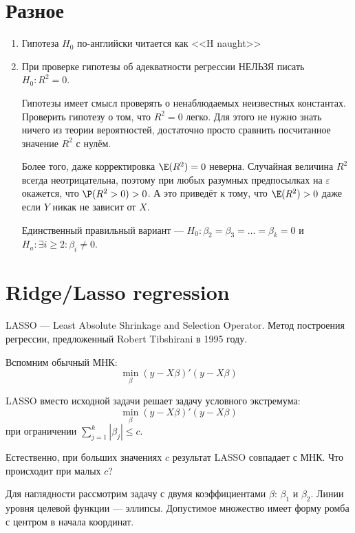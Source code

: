 \documentclass[pdftex,12pt,a4paper]{article}
\begin{document}
\section{Разное}
\begin{enumerate}

\item Гипотеза $H_0$ по-английски читается как <<H naught>>
\item При проверке гипотезы об адекватности регрессии НЕЛЬЗЯ писать $H_0: R^2=0$. 


Гипотезы имеет смысл проверять о ненаблюдаемых неизвестных константах. 
Проверить гипотезу о том, что $R^2=0$ легко. 
Для этого не нужно знать ничего из теории вероятностей, достаточно просто сравнить посчитанное значение $R^2$ с нулём. 

Более того, даже корректировка $\E(R^2)=0$ неверна. 
Случайная величина $R^2$ всегда неотрицательна, поэтому при любых разумных предпосылках на $\varepsilon$ окажется, что $\P(R^2>0)>0$. 
А это приведёт к тому, что $\E(R^2)>0$ даже если $Y$ никак не зависит от $X$.


Единственный правильный вариант --- $H_0: \beta_2=\beta_3=\ldots=\beta_k=0$ и $H_a: \exists i\geq 2 : \beta_i\neq 0$.
\end{enumerate}



\section{Ridge/Lasso regression}

LASSO --- Least Absolute Shrinkage and Selection Operator. Метод построения регрессии, предложенный Robert Tibshirani в 1995 году.

Вспомним обычный МНК:
\begin{equation}
\min_{\beta} (y-X\beta)'(y-X\beta)
\end{equation}


LASSO вместо исходной задачи решает задачу условного экстремума:
\begin{equation}
\min_{\beta} (y-X\beta)'(y-X\beta)
\end{equation}
при ограничении $\sum_{j=1}^{k}|\beta_j|\leq c$.


Естественно, при больших значениях $c$ результат LASSO совпадает с МНК. Что происходит при малых $c$?


Для наглядности рассмотрим задачу с двумя коэффициентами $\beta$: $\beta_1$ и $\beta_2$. Линии уровня целевой функции --- эллипсы. Допустимое множество имеет форму ромба с центром в начала координат.
\end{document}
